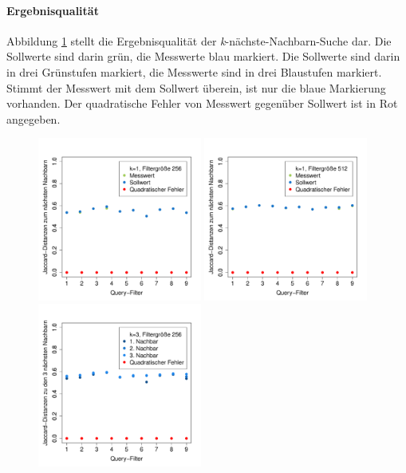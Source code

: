 \paragraph*{Ergebnisqualität}
Abbildung \ref{fig:quality} stellt die Ergebnisqualität der \textit{k}-nächste-Nachbarn-Suche dar. Die Sollwerte sind darin grün, die Messwerte blau markiert. Die Sollwerte sind darin in drei Grünstufen markiert, die Messwerte sind in drei Blaustufen markiert. Stimmt der Messwert mit dem Sollwert überein, ist nur die blaue Markierung vorhanden. Der quadratische Fehler von Messwert gegenüber Sollwert ist in Rot angegeben. 
\begin{figure}[hpbt]
	\centering
	\label{fig:quality}
 	\includegraphics[width=0.48\textwidth]{pictures/nn_256.pdf}
 	\hspace{0.01\textwidth}
 	\includegraphics[width=0.48\textwidth]{pictures/nn_512.pdf}\\[0pt]
	\includegraphics[width=0.48\textwidth]{pictures/nn3_256-2.pdf}

\end{figure}
